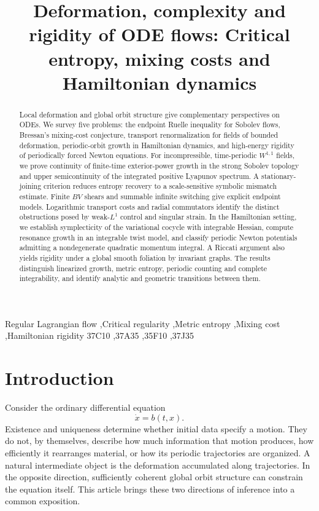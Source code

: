 \documentclass[review,12pt,times,a4paper,nopreprintline]{elsarticle}
\theoremstyle{plain}
\theoremstyle{definition}
\theoremstyle{remark}
\numberwithin{equation}{section}
\begin{document}
\begin{frontmatter}
\title{Deformation, complexity and rigidity of ODE flows: Critical entropy, mixing costs and Hamiltonian dynamics}
\begin{abstract}
Local deformation and global orbit structure give complementary perspectives on ODEs. We survey five problems: the endpoint Ruelle inequality for Sobolev flows, Bressan's mixing-cost conjecture, transport renormalization for fields of bounded deformation, periodic-orbit growth in Hamiltonian dynamics, and high-energy rigidity of periodically forced Newton equations. For incompressible, time-periodic $W^{1,1}$ fields, we prove continuity of finite-time exterior-power growth in the strong Sobolev topology and upper semicontinuity of the integrated positive Lyapunov spectrum. A stationary-joining criterion reduces entropy recovery to a scale-sensitive symbolic mismatch estimate. Finite $BV$ shears and summable infinite switching give explicit endpoint models. Logarithmic transport costs and radial commutators identify the distinct obstructions posed by weak-$L^1$ control and singular strain. In the Hamiltonian setting, we establish symplecticity of the variational cocycle with integrable Hessian, compute resonance growth in an integrable twist model, and classify periodic Newton potentials admitting a nondegenerate quadratic momentum integral. A Riccati argument also yields rigidity under a global smooth foliation by invariant graphs. The results distinguish linearized growth, metric entropy, periodic counting and complete integrability, and identify analytic and geometric transitions between them.
\end{abstract}
\begin{keyword}
Regular Lagrangian flow \sep Critical regularity \sep Metric entropy \sep Mixing cost \sep Hamiltonian rigidity
\MSC[2020] 37C10 \sep 37A35 \sep 35F10 \sep 37J35
\end{keyword}
\end{frontmatter}

\section{Introduction}\label{sec:intro}
Consider the ordinary differential equation
\begin{equation}\label{eq:opening}
 \dot x=b(t,x).
\end{equation}
Existence and uniqueness determine whether initial data specify a motion. They do not, by themselves, describe how much information that motion produces, how efficiently it rearranges material, or how its periodic trajectories are organized. A natural intermediate object is the deformation accumulated along trajectories. In the opposite direction, sufficiently coherent global orbit structure can constrain the equation itself. This article brings these two directions of inference into a common exposition.
\end{document}
